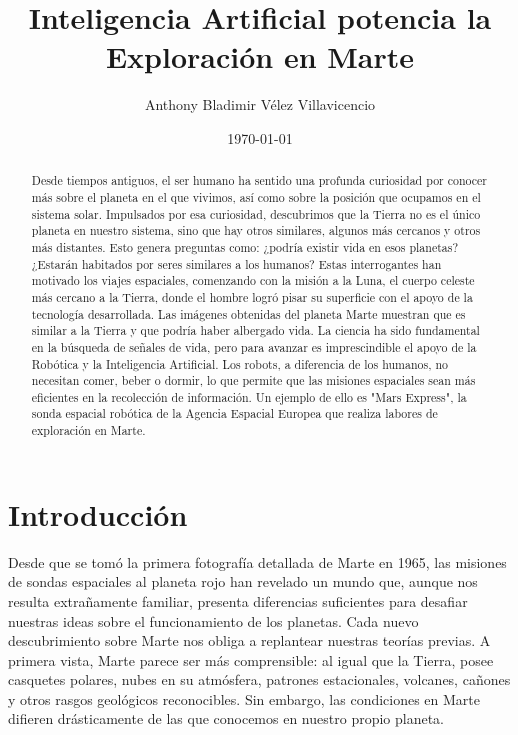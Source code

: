\documentclass[a4paper]{article}
\title{Inteligencia Artificial potencia la Exploración en Marte}
\author{Anthony Bladimir Vélez Villavicencio}
\date{\today}
\begin{document}
\maketitle

\begin{abstract}
Desde tiempos antiguos, el ser humano ha sentido una profunda curiosidad por conocer más sobre el planeta en el que vivimos, así como sobre la posición que ocupamos en el sistema solar. Impulsados por esa curiosidad, descubrimos que la Tierra no es el único planeta en nuestro sistema, sino que hay otros similares, algunos más cercanos y otros más distantes. Esto genera preguntas como: ¿podría existir vida en esos planetas? ¿Estarán habitados por seres similares a los humanos? Estas interrogantes han motivado los viajes espaciales, comenzando con la misión a la Luna, el cuerpo celeste más cercano a la Tierra, donde el hombre logró pisar su superficie con el apoyo de la tecnología desarrollada. Las imágenes obtenidas del planeta Marte muestran que es similar a la Tierra y que podría haber albergado vida. La ciencia ha sido fundamental en la búsqueda de señales de vida, pero para avanzar es imprescindible el apoyo de la Robótica y la Inteligencia Artificial. Los robots, a diferencia de los humanos, no necesitan comer, beber o dormir, lo que permite que las misiones espaciales sean más eficientes en la recolección de información. Un ejemplo de ello es "Mars Express", la sonda espacial robótica de la Agencia Espacial Europea que realiza labores de exploración en Marte.
\end{abstract}

\section{Introducción}


Desde que se tomó la primera fotografía detallada de Marte en 1965, las misiones de sondas espaciales al planeta rojo han revelado un mundo que, aunque nos resulta extrañamente familiar, presenta diferencias suficientes para desafiar nuestras ideas sobre el funcionamiento de los planetas. Cada nuevo descubrimiento sobre Marte nos obliga a replantear nuestras teorías previas. A primera vista, Marte parece ser más comprensible: al igual que la Tierra, posee casquetes polares, nubes en su atmósfera, patrones estacionales, volcanes, cañones y otros rasgos geológicos reconocibles. Sin embargo, las condiciones en Marte difieren drásticamente de las que conocemos en nuestro propio planeta.
\end{document}
